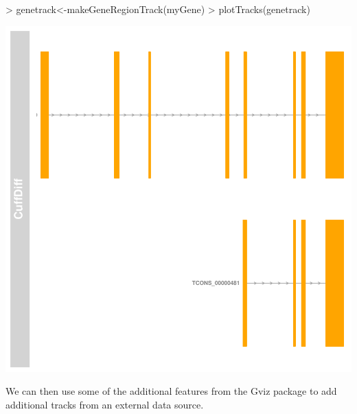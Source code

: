 \documentclass[10pt]{article}
\newcommand{\Rpackage}[1]{\textsf{#1}}
\begin{document}
\begin{Schunk}
\begin{Sinput}
> genetrack<-makeGeneRegionTrack(myGene)
> plotTracks(genetrack)
\end{Sinput}
\end{Schunk}
\includegraphics{graphics/cummeRbund-manual-features_2}

We can then use some of the additional features from the \Rpackage{Gviz} package
to add additional tracks from an external data source.
\end{document}
